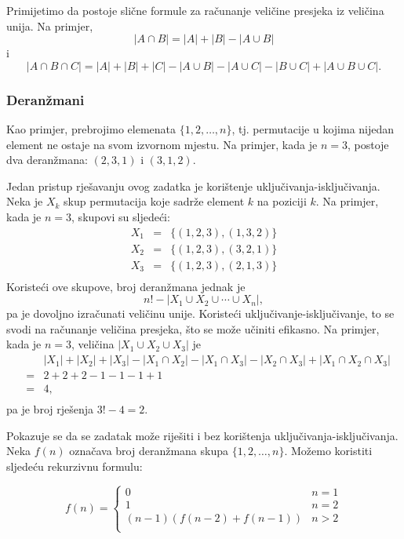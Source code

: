 Primijetimo da postoje slične formule
za računanje
veličine presjeka iz veličina
unija. Na primjer,
\[ |A \cap B| = |A| + |B| - |A \cup B|\]
i
\[ |A \cap B \cap C| = |A| + |B| + |C| - |A \cup B|  - |A \cup C|  - |B \cup C| + |A \cup B \cup C| .\]

\subsubsection{Deranžmani}


Kao primjer, prebrojimo 
elemenata $\{1,2,\ldots,n\}$, tj. permutacije
u kojima nijedan element ne ostaje na svom izvornom mjestu.
Na primjer, kada je $n=3$, postoje
dva deranžmana: $(2,3,1)$ i $(3,1,2)$.

Jedan pristup rješavanju ovog zadatka je korištenje
uključivanja-isključivanja.
Neka je $X_k$ skup permutacija
koje sadrže element $k$ na poziciji $k$.
Na primjer, kada je $n=3$, skupovi su sljedeći:
\[
\begin{array}{lcl}
X_1 & = & \{(1,2,3),(1,3,2)\} \\
X_2 & = & \{(1,2,3),(3,2,1)\} \\
X_3 & = & \{(1,2,3),(2,1,3)\} \\
\end{array}
\]
Koristeći ove skupove, broj deranžmana jednak je
\[ n! - |X_1 \cup X_2 \cup \cdots \cup X_n|, \]
pa je dovoljno izračunati veličinu unije.
Koristeći uključivanje-isključivanje, to se svodi na
računanje veličina presjeka, što se može
učiniti efikasno.
Na primjer, kada je $n=3$, veličina
$|X_1 \cup X_2 \cup X_3|$ je
\[
\begin{array}{lcl}
 & & |X_1| + |X_2| + |X_3| - |X_1 \cap X_2|  - |X_1 \cap X_3|  - |X_2 \cap X_3| + |X_1 \cap X_2 \cap X_3| \\
 & = & 2+2+2-1-1-1+1 \\
 & = & 4, \\
\end{array}
\]
pa je broj rješenja $3!-4=2$.

Pokazuje se da se zadatak može riješiti
i bez korištenja uključivanja-isključivanja.
Neka $f(n)$ označava broj deranžmana
skupa $\{1,2,\ldots,n\}$. Možemo koristiti sljedeću
rekurzivnu formulu:

\begin{equation*}
    f(n) = \begin{cases}
               0               & n = 1\\
               1               & n = 2\\
               (n-1)(f(n-2) + f(n-1)) & n>2 \\
           \end{cases}
\end{equation*}

